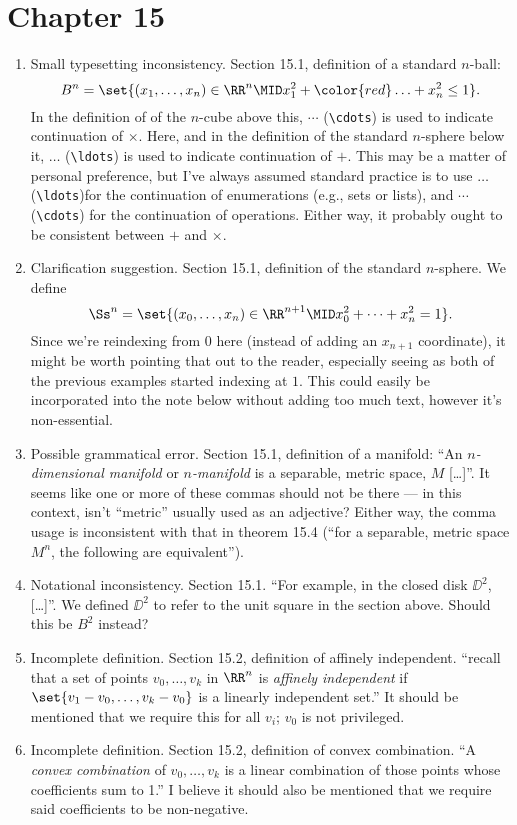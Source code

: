 \documentclass{fkletter}
\begin{document}
\section*{Chapter 15}
\begin{enumerate}
  \item Small typesetting inconsistency. Section 15.1, definition of a standard
    $n$-ball:
    \[
      B^n = \set{(x_1, \ldots, x_n) \in \RR^n \MID x_1^2 + {\color{red} \ldots}
        + x_n^2 \leq 1}.
    \]
    In the definition of of the $n$-cube above this, $\cdots$
    (\verb|\cdots|) is used to indicate continuation of $\times$. Here, and in
    the definition of the standard $n$-sphere below it, $\ldots$ (\verb|\ldots|)
    is used to indicate continuation of $+$. This may be a matter of personal
    preference, but I've always assumed standard practice is to use $\ldots$
    (\verb|\ldots|)for the continuation of enumerations (e.g., sets or lists),
    and $\cdots$ (\verb|\cdots|) for the continuation of operations. Either way,
    it probably ought to be consistent between $+$ and $\times$.
  \item Clarification suggestion. Section 15.1, definition of the standard
    $n$-sphere. We define
    \[
      \Ss^n = \set{(x_0, \ldots, x_n) \in \RR^{n+1} \MID x_0^2 + \cdots + x_n^2
        = 1}.
    \]
    Since we're reindexing from $0$ here (instead of adding an $x_{n+1}$
    coordinate), it might be worth pointing that out to the reader, especially
    seeing as both of the previous examples started indexing at $1$. This could
    easily be incorporated into the note below without adding too much text,
    however it's non-essential.
  \item Possible grammatical error. Section 15.1, definition of a manifold: ``An
    \emph{$n$-dimensional manifold} or \emph{$n$-manifold} is a {\color{red}
      separable, metric space, $M$} [\ldots]''. It seems like one or more of
    these commas should not be there --- in this context, isn't ``metric'' usually
    used as an adjective? Either way, the comma usage is inconsistent with that
    in theorem 15.4 (``for a separable, metric space $M^n$, the following are
    equivalent'').
  \item Notational inconsistency. Section 15.1. ``For example, in the
    {\color{red} closed disk $\DD^2$}, [\ldots]''. We defined $\DD^2$ to refer
    to the unit square in the section above. Should this be $B^2$ instead?
  \item Incomplete definition. Section 15.2, definition of affinely independent.
    ``recall that a set of points $v_0, \ldots, v_k$ in $\RR^n$ is
    \emph{affinely independent} if $\set{v_1 - v_0, \ldots, v_k - v_0}$ is a
    linearly independent set.'' {\color{red} It should be mentioned that we
      require this for all $v_i$; $v_0$ is not privileged.}
  \item Incomplete definition. Section 15.2, definition of convex combination.
    ``A \emph{convex combination} of $v_0, \ldots, v_k$ is a linear combination
    of those points whose coefficients sum to 1.'' {\color{red} I believe it
      should also be mentioned that we require said coefficients to be
      non-negative.}
\end{enumerate}
\end{document}
